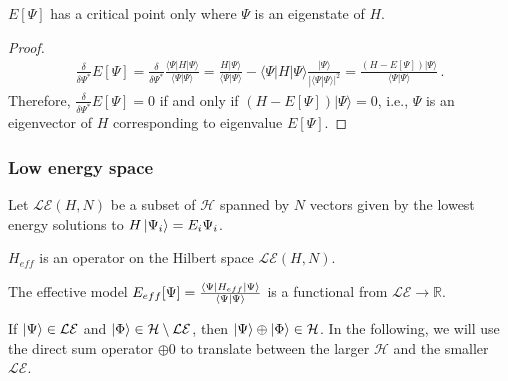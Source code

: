 \begin{theorem}
\label{theorem:criticalpoint}
$E[\Psi]$ has a critical point only where $\Psi$ is an eigenstate of $H$.
\end{theorem}
\begin{proof}
\begin{eqnarray}
\frac{\delta }{\delta \Psi^*}  E[\Psi] = \frac{\delta}{\delta \Psi^*}\frac{\langle \Psi |H|\Psi\rangle}{\langle \Psi |\Psi\rangle} = \frac{H|\Psi\rangle}{\langle \Psi |\Psi\rangle} - \langle \Psi |H|\Psi\rangle \frac{|\Psi \rangle}{|\langle \Psi | \Psi\rangle|^2} =\frac{ (H-E[\Psi])|\Psi\rangle }{\langle\Psi|\Psi\rangle}\,.
\end{eqnarray}
Therefore, 
$\frac{\delta }{\delta \Psi^*}  E[\Psi] = 0$ if and only if $(H-E[\Psi])|\Psi\rangle =0$, i.e., $\Psi$ is an eigenvector of $H$ corresponding to eigenvalue $E[\Psi]$.  
\end{proof}

\subsubsection{Low energy space} 

\begin{definition}
Let $\mathcal{LE}(H,N)$ be a subset of ${\mathcal H}$ spanned by $N$ vectors given by the lowest energy solutions to $H\ket{\Psi_i}=E_i{\Psi_i}$. 
\end{definition}

\begin{definition}
$H_{eff}$ is an operator on the Hilbert space ${\mathcal {LE}(H,N)}$.	 
\end{definition}

\begin{definition}
The effective model $E_{eff}[\Psi]=\frac{\bra{\Psi}H_{eff}\ket{\Psi}}{\braket{\Psi|\Psi}}$ is a functional from $\mathcal{LE} \rightarrow \mathbb{R}$. 
\end{definition}

If $\ket{\Psi}\in \mathcal{LE}$ and $\ket{\Phi}\in {\mathcal H} \setminus \mathcal{LE}$, then $\ket{\Psi} \oplus \ket{\Phi} \in {\mathcal H}$.
In the following, we will use the direct sum operator $\oplus 0$ to translate between the larger ${\mathcal H}$ and the smaller $\mathcal{LE}$. 

